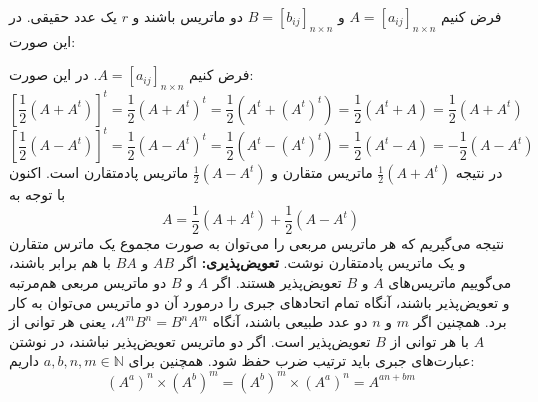 فرض کنیم
$A=[a_{ij}]_{n \times n}$
و
$B=[b_{ij}]_{n \times n}$
دو ماتریس باشند و $r$ یک عدد حقیقی. در این صورت:

فرض کنیم
$A=[a_{ij}]_{n \times n}$.
در این صورت:
\[
\left[ \frac{1}{2}(A+A^t) \right]^t = \frac{1}{2}(A+A^t)^t = \frac{1}{2}(A^t+(A^t)^t) = \frac{1}{2}(A^t+A) = \frac{1}{2}(A+A^t)
\]
\[
\left[ \frac{1}{2}(A-A^t) \right]^t = \frac{1}{2}(A-A^t)^t = \frac{1}{2}(A^t-(A^t)^t) = \frac{1}{2}(A^t-A) = -\frac{1}{2}(A-A^t)
\]
در نتیجه
$\frac{1}{2}(A+A^t)$
ماتریس متقارن و
$\frac{1}{2}(A-A^t)$
ماتریس پادمتقارن است. اکنون با توجه به
$$A=\frac{1}{2}(A+A^t)+\frac{1}{2}(A-A^t)$$
نتیجه می‌گیریم که هر ماتریس مربعی را می‌توان به صورت مجموع یک ماترس متقارن و یک ماتریس پادمتقارن نوشت.
\smallskip
\textbf{تعویض‌پذیری:}
اگر $AB$ و $BA$ با هم برابر باشند، می‌گوییم ماتریس‌های $A$ و $B$ تعویض‌پذیر هستند. اگر $A$ و $B$ دو ماتریس مربعی هم‌مرتبه و تعویض‌پذیر باشند، آنگاه تمام اتحادهای جبری را درمورد آن دو ماتریس می‌توان به کار برد. همچنین اگر $m$ و $n$ دو عدد طبیعی باشند، آنگاه
$A^mB^n = B^nA^m$،
یعنی هر توانی از $A$ با هر توانی از $B$ تعویض‌پذیر است. اگر دو ماتریس تعویض‌پذیر نباشند، در نوشتن عبارت‌های جبری باید ترتیب ضرب حفظ شود. همچنین برای
$a,b,n,m \in \mathbb{N}$
داریم:
$$(A^a)^n \times (A^b)^m = (A^b)^m \times (A^a)^n= A^{an+bm}$$

